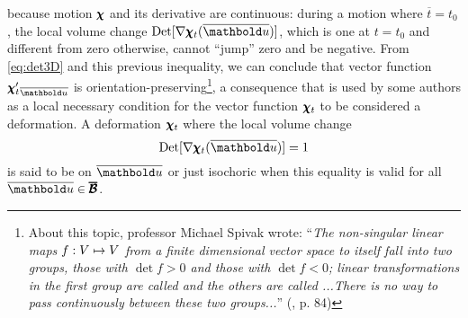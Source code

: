 because motion $\pmb{\chi}$ and its derivative are continuous: during a motion where $\overline{t}=t_0$, the local volume change $\textnormal{Det}[\fua{\nabla\tnr{\chi}_{t}}{\overline{\vto{u}}}]$, which is one at $t=t_0$ and different from zero otherwise, cannot ``jump'' zero and be negative. From \eqref{eq:det3D} and this previous inequality, we can conclude that vector function ${\tnr{\chi}'_t}_{\overline{\vto{u}}}$ is orientation-preserving\footnote{About this topic, professor Michael Spivak wrote: ``\emph{The non-singular linear maps $f : V \mapsto V$ from a finite dimensional vector space to itself fall into two groups, those with $\det f>0$ and those with $\det f<0$; linear transformations in the first group are called  and the others are called ...There is no way to pass continuously between these two groups...}'' (\cite{spivak_2005_1}, p. 84)}, a consequence that is used by some authors as a local necessary condition for the vector function $\pmb{\chi}_t$ to be considered a deformation. A deformation  $\pmb{\chi}_t$ where the local volume change
\begin{equation}
\textnormal{Det}[\fua{\nabla\tnr{\chi}_t}{\overline{\vto{u}}}]=1
\end{equation}
is said to be  on $\overline{\vto{u}}$ or just isochoric when this equality is valid for all $\overline{\vto{u}}\in\tnr{\overline{\mathcal{B}}}$. 


